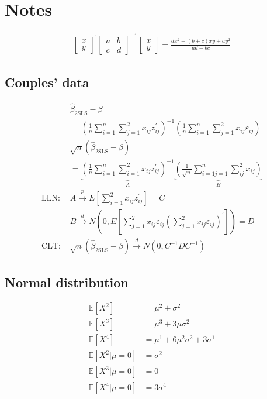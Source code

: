 \section{Notes}

\begin{align*}
    \left[
    \begin{array}{l}
        x \\
        y
    \end{array}
    \right]^{\prime}
    \left[
    \begin{array}{ll}
        a & b \\
        c & d
    \end{array}
    \right]^{-1}
    \left[
    \begin{array}{l}
        x \\
        y
    \end{array}
    \right]=\frac{d x^2-(b+c) x y+a y^2}{a d-b c}
\end{align*}

\subsection{Couples' data}

\begin{align*}
    &\hat{\beta}_{\text{2SLS}}-\beta  \\
    &=\left(\frac{1}{n} \sum_{i=1}^n \sum_{j=1}^2 x_{i j} z_{i j}^\prime\right)^{-1}\left(\frac{1}{n} \sum_{i=1}^n \sum_{j=1}^2 x_{i j} \varepsilon_{i j}\right) \\
    &\sqrt{n}\left(\hat{\beta}_{\text{2SLS}}-\beta\right)  \\
    &=\underbrace{\left(\frac{1}{n} \sum_{i=1}^n \sum_{i=1}^2 x_{i j} z_{i j}^\prime\right)^{-1}}_A \underbrace{\left(\frac{1}{\sqrt{n}} \sum_{i=1 j=1}^n \sum_{i j}^2 x_{i j}\right)}_B \\
    \text{LLN: }& A \stackrel{p}{\longrightarrow} E\left[\sum_{i=1}^2 x_{i j} z_{i j}^\prime\right]=C \\
    &B \stackrel{d}{\longrightarrow} N\left(0, E\left[\sum_{j=1}^2 x_{i j} \varepsilon_{i j}\left(\sum_{j=1}^2 x_{i j} \varepsilon_{i j}\right)^{\prime}\right]\right)=D \\
    \text{CLT: }& \sqrt{n}\left(\hat{\beta}_{\text{2SLS}}-\beta\right)\stackrel{d}{\longrightarrow} N\left(0, C^{-1}DC^{-1}\right)
\end{align*}

\subsection{Normal distribution}

\begin{align*}
    \mathbb{E}\left[X^2\right] &= \mu^2+\sigma^2 \\
    \mathbb{E}\left[X^3\right] &= \mu^3+3 \mu \sigma^2 \\
    \mathbb{E}\left[X^4\right] &= \mu^1+6 \mu^2 \sigma^2+3 \sigma^1 \\
    \mathbb{E}\left[X^2|\mu=0\right] &=  \sigma^2 \\
    \mathbb{E}\left[X^3|\mu=0\right] &=  0 \\
    \mathbb{E}\left[X^4|\mu=0\right] &= 3 \sigma^4
\end{align*}